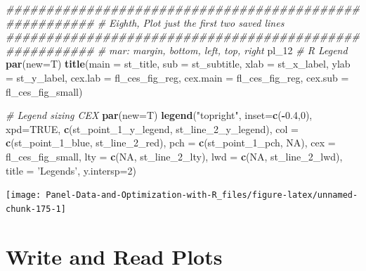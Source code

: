 \documentclass[
]{book}
\newenvironment{Shaded}{\begin{snugshade}}{\end{snugshade}}
\newcommand{\CommentTok}[1]{\textcolor[rgb]{0.56,0.35,0.01}{\textit{#1}}}
\newcommand{\DataTypeTok}[1]{\textcolor[rgb]{0.13,0.29,0.53}{#1}}
\newcommand{\DecValTok}[1]{\textcolor[rgb]{0.00,0.00,0.81}{#1}}
\newcommand{\FloatTok}[1]{\textcolor[rgb]{0.00,0.00,0.81}{#1}}
\newcommand{\KeywordTok}[1]{\textcolor[rgb]{0.13,0.29,0.53}{\textbf{#1}}}
\newcommand{\NormalTok}[1]{#1}
\newcommand{\OperatorTok}[1]{\textcolor[rgb]{0.81,0.36,0.00}{\textbf{#1}}}
\newcommand{\OtherTok}[1]{\textcolor[rgb]{0.56,0.35,0.01}{#1}}
\newcommand{\StringTok}[1]{\textcolor[rgb]{0.31,0.60,0.02}{#1}}
\begin{document}
\begin{Shaded}
\begin{Highlighting}[]
\CommentTok{#######################################################}
\CommentTok{# Eighth, Plot just the first two saved lines}
\CommentTok{#######################################################}
\CommentTok{# mar: margin, bottom, left, top, right}
\NormalTok{pl_}\DecValTok{12}
\CommentTok{# R Legend}
\KeywordTok{par}\NormalTok{(}\DataTypeTok{new=}\NormalTok{T)}
\KeywordTok{title}\NormalTok{(}\DataTypeTok{main =}\NormalTok{ st_title, }\DataTypeTok{sub =}\NormalTok{ st_subtitle, }\DataTypeTok{xlab =}\NormalTok{ st_x_label, }\DataTypeTok{ylab =}\NormalTok{ st_y_label,}
      \DataTypeTok{cex.lab =}\NormalTok{ fl_ces_fig_reg,}
      \DataTypeTok{cex.main =}\NormalTok{ fl_ces_fig_reg,}
      \DataTypeTok{cex.sub =}\NormalTok{ fl_ces_fig_small)}

\CommentTok{# Legend sizing CEX}
\KeywordTok{par}\NormalTok{(}\DataTypeTok{new=}\NormalTok{T)}
\KeywordTok{legend}\NormalTok{(}\StringTok{"topright"}\NormalTok{,}
       \DataTypeTok{inset=}\KeywordTok{c}\NormalTok{(}\OperatorTok{-}\FloatTok{0.4}\NormalTok{,}\DecValTok{0}\NormalTok{),}
       \DataTypeTok{xpd=}\OtherTok{TRUE}\NormalTok{,}
       \KeywordTok{c}\NormalTok{(st_point_}\DecValTok{1}\NormalTok{_y_legend, st_line_}\DecValTok{2}\NormalTok{_y_legend),}
       \DataTypeTok{col =} \KeywordTok{c}\NormalTok{(st_point_}\DecValTok{1}\NormalTok{_blue, st_line_}\DecValTok{2}\NormalTok{_red),}
       \DataTypeTok{pch =} \KeywordTok{c}\NormalTok{(st_point_}\DecValTok{1}\NormalTok{_pch, }\OtherTok{NA}\NormalTok{),}
       \DataTypeTok{cex =}\NormalTok{ fl_ces_fig_small,}
       \DataTypeTok{lty =} \KeywordTok{c}\NormalTok{(}\OtherTok{NA}\NormalTok{, st_line_}\DecValTok{2}\NormalTok{_lty),}
       \DataTypeTok{lwd =} \KeywordTok{c}\NormalTok{(}\OtherTok{NA}\NormalTok{, st_line_}\DecValTok{2}\NormalTok{_lwd),}
       \DataTypeTok{title =} \StringTok{'Legends'}\NormalTok{,}
       \DataTypeTok{y.intersp=}\DecValTok{2}\NormalTok{)}
\end{Highlighting}
\end{Shaded}

\begin{center}\texttt{[image: Panel-Data-and-Optimization-with-R\_files/figure-latex/unnamed-chunk-175-1]} \end{center}

\hypertarget{write-and-read-plots}{%
\section{Write and Read Plots}\label{write-and-read-plots}}
\end{document}
